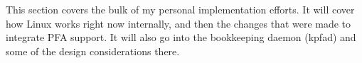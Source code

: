 This section covers the bulk of my personal implementation efforts. It will cover how Linux works right now internally, and then the changes that were made to integrate PFA support. It will also go into the bookkeeping daemon (kpfad) and some of the design considerations there.